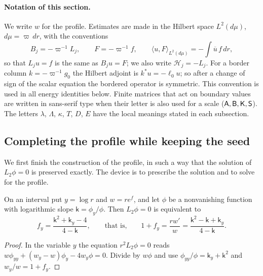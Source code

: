 \paragraph{Notation of this section.}
We write $w$ for the profile. Estimates are made in the Hilbert space
$L^2(d\mu)$, $d\mu=\varpi\,dr$, with the conventions
\begin{equation}\label{eq:rad-eq-hn1}
 B_j=-\varpi^{-1}L_j,
 \qquad F=-\varpi^{-1}f,\qquad
 \langle u,F\rangle_{L^2(d\mu)}=-\int\overline u\,f\,dr ,
\end{equation}
so that $L_ju=f$ is the same as $B_ju=F$; we also write
$\mathscr H_j=-L_j$. For a border column $k=-\varpi^{-1}g_0$ the
Hilbert adjoint is $k^*u=-\ell_0u$; so after a change of sign of the
scalar equation the bordered operator is symmetric. This convention is
used in all energy identities below. Finite matrices that act on
boundary values are written in sans-serif type when their letter is
also used for a scale ($\mathsf A,\mathsf B,\mathsf K,\mathsf S$). The letters $\lambda$,
$\Lambda$, $\kappa$, $T$, $D$, $E$ have the local meanings stated in
each subsection.

\subsection{Completing the profile while keeping the seed}
\label{subsec:rad-cone-bump-target-match}

We first finish the construction of the profile, in such a way that
the solution of $L_2\phi=0$ is preserved exactly. The device is to
prescribe the solution and to solve for the profile.

\begin{lemma}[Connectors]\label{lem:connector}
On an interval put $y=\log r$ and $w=re^f$, and let $\phi$ be a
nonvanishing function with logarithmic slope
$\mathsf k=\phi_y/\phi$. Then $L_2\phi=0$ is equivalent to
\begin{equation}\label{eq:rad-eq-sp1}
 f_y=\frac{\mathsf k^2+\mathsf k_y-4}{4-\mathsf k},
 \qquad\text{that is,}\qquad
 1+f_y=\frac{rw'}{w}=\frac{\mathsf k^2-\mathsf k+\mathsf k_y}{4-\mathsf k}.
\end{equation}
\end{lemma}

\begin{proof}
In the variable $y$ the equation $r^2L_2\phi=0$ reads
$w\phi_{yy}+(w_y-w)\phi_y-4w_y\phi=0$. Divide by $w\phi$ and use
$\phi_{yy}/\phi=\mathsf k_y+\mathsf k^2$ and $w_y/w=1+f_y$.
\end{proof}


